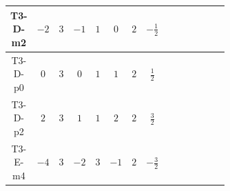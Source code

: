 \documentclass[8pt]{article}
\begin{document}
\begin{landscape}
\begin{longtable}{@{}cccccccc >{\raggedright\arraybackslash}p{0.21\linewidth} >{\raggedright\arraybackslash}p{0.21\linewidth} >{\raggedright\arraybackslash}p{0.21\linewidth}@{}}
T3-D-m2 & $-2$ & $3$ & $-1$ & $1$ & $0$ & $2$ & $-\frac{1}{2}$ & \scriptsize\adjustbox{max width=\linewidth}{$\begin{gathered} +D_{\mu _1}\left(S_2\right){}^{\dagger } D_{\mu _1}\left(S_2\right)\end{gathered}$} & \scriptsize\adjustbox{max width=\linewidth}{$\begin{gathered} -\overline{F_{j_1,r_1}}\, F_{j_1,r_1} M_F\end{gathered}$} & \scriptsize\adjustbox{max width=\linewidth}{$\begin{gathered} +i \overline{F_{j_1,r_1}}\, \gamma ^{\mu _1}\, D_{\mu _1}\left(F_{j_1,r_1}\right)\end{gathered}$} \\
\midrule
T3-D-p0 & $0$ & $3$ & $0$ & $1$ & $1$ & $2$ & $\frac{1}{2}$ & \scriptsize\adjustbox{max width=\linewidth}{$\begin{gathered} +D_{\mu _1}\left(S_2\right){}^{\dagger } D_{\mu _1}\left(S_2\right)\end{gathered}$} & \scriptsize\adjustbox{max width=\linewidth}{$\begin{gathered} -\overline{F_{j_1,r_1}}\, F_{j_1,r_1} M_F\end{gathered}$} & \scriptsize\adjustbox{max width=\linewidth}{$\begin{gathered} +i \overline{F_{j_1,r_1}}\, \gamma ^{\mu _1}\, D_{\mu _1}\left(F_{j_1,r_1}\right)\end{gathered}$} \\
\midrule
T3-D-p2 & $2$ & $3$ & $1$ & $1$ & $2$ & $2$ & $\frac{3}{2}$ & \scriptsize\adjustbox{max width=\linewidth}{$\begin{gathered} +D_{\mu _1}\left(S_2\right){}^{\dagger } D_{\mu _1}\left(S_2\right)\end{gathered}$} & \scriptsize\adjustbox{max width=\linewidth}{$\begin{gathered} -\overline{F_{j_1,r_1}}\, F_{j_1,r_1} M_F\end{gathered}$} & \scriptsize\adjustbox{max width=\linewidth}{$\begin{gathered} +i \overline{F_{j_1,r_1}}\, \gamma ^{\mu _1}\, D_{\mu _1}\left(F_{j_1,r_1}\right)\end{gathered}$} \\
\midrule
T3-E-m4 & $-4$ & $3$ & $-2$ & $3$ & $-1$ & $2$ & $-\frac{3}{2}$ & \scriptsize\adjustbox{max width=\linewidth}{$\begin{gathered} +D_{\mu _1}\left(S_{2,j_1}\right){}^{\dagger } D_{\mu _1}\left(S_{2,j_1}\right)\end{gathered}$} & \scriptsize\adjustbox{max width=\linewidth}{$\begin{gathered} -\overline{F_{j_1,r_1}}\, F_{j_1,r_1} M_F\end{gathered}$} & \scriptsize\adjustbox{max width=\linewidth}{$\begin{gathered} +i \overline{F_{j_1,r_1}}\, \gamma ^{\mu _1}\, D_{\mu _1}\left(F_{j_1,r_1}\right)\end{gathered}$} \\

\end{longtable}
\end{landscape}
\end{document}
